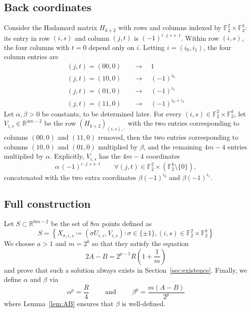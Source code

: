 \documentclass[11pt,reqno]{amsart}
\theoremstyle{plain}
\theoremstyle{definition}
\theoremstyle{remark}
\newcommand{\F}{\mathbb{F}}
\newcommand{\R}{\mathbb{R}}
\numberwithin{equation}{section}
\begin{document}
\subsection{Back coordinates}
Consider the Hadamard matrix $H_{k+2}$ with rows and columns indexed by $\F_2^2\times\F_2^k$: its entry in row $(i,s)$ and column $(j,t)$ is $(-1)^{i\cdot j+s\cdot t}$. Within row $(i,s)$, the four columns with $t=0$ depend only on $i$. Letting $i=(i_0,i_1)$, the four column entries are
\begin{align*}
    (j,t)=(00,0) &\quad\longrightarrow\quad 1\\
    (j,t)=(10,0) &\quad\longrightarrow\quad (-1)^{i_0}\\
    (j,t)=(01,0) &\quad\longrightarrow\quad (-1)^{i_1}\\
    (j,t)=(11,0) &\quad\longrightarrow\quad (-1)^{i_0+i_1}
\end{align*}
Let $\alpha,\beta>0$ be constants, to be determined later. For every $(i,s)\in\F_2^2\times \F_2^k$, let $V_{i,s}\in\R^{4m-2}$ be the row $(H_{k+2})_{(i,s),:}$ with the two entries corresponding to columns $(00,0)$ and $(11,0)$ removed, then the two entries corresponding to columns $(10,0)$ and $(01,0)$ multiplied by $\beta$, and the remaining $4m-4$ entries multiplied by $\alpha$. Explicitly, $V_{i,s}$ has the $4m-4$ coordinates
\[\alpha\,(-1)^{i\cdot j+s\cdot t}\qquad \forall (j,t)\in\F_2^2\times\left(\F_2^k\setminus\{0\}\right),\]
concatenated with the two extra coordinates $\beta(-1)^{i_0}$ and $\beta(-1)^{i_1}$.

\subsection{Full construction}
Let $S\subset \R^{8m-2}$ be the set of $8m$ points defined as
\[S=\left\{X_{\sigma,i,s}\coloneqq (\sigma U_{i,s},V_{i,s})\colon \sigma\in\{\pm 1\}, (i,s)\in\F_2^2\times\F_2^k\right\}\]
We choose $a>1$ and $m=2^k$ so that they satisfy the equation
\begin{equation}\label{eq:constraint}
2A-B = 2^{p-1}R\left(1+\frac{1}{m}\right)
\end{equation}
and prove that such a solution always exists in Section~\ref{sec:existence}. Finally, we define $\alpha$ and $\beta$ via
\begin{equation}\label{eq:alphabeta}
\alpha^{p}=\frac{R}{4}\qquad\text{ and }\qquad\beta^{p}=\frac{m(A-B)}{2^p}
\end{equation}
where Lemma~\ref{lem:AB} ensures that $\beta$ is well-defined.
\end{document}
